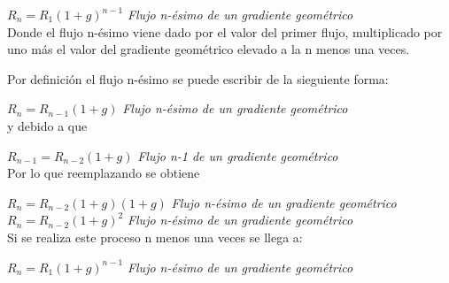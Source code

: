 \begin{itemize}
\vspace{4mm}

$R_{n} = R_{1}(1+g)^{n-1}$ \hspace{37 pt} \textit{Flujo n-ésimo de un gradiente geométrico}\\

Donde el flujo n-ésimo viene dado por el valor del primer flujo, multiplicado por uno más el valor del gradiente geométrico elevado a la n menos una veces.

\vspace{4mm}

Por definición el flujo n-ésimo se puede escribir de la sieguiente forma:

\vspace{4mm}

$R_{n} = R_{n-1}(1+g)$ \hspace{44 pt} \textit{Flujo n-ésimo de un gradiente geométrico}\\

y debido a que

\vspace{4mm}

$R_{n-1} = R_{n-2}(1+g)$ \hspace{31 pt} \textit{Flujo n-1 de un gradiente geométrico}\\

Por lo que reemplazando se obtiene

\vspace{4mm}

$R_{n} = R_{n-2}(1+g)(1+g)$ \hspace{9 pt} \textit{Flujo n-ésimo de un gradiente geométrico}\\

$R_{n} = R_{n-2}(1+g)^{2}$ \hspace{35 pt} \textit{Flujo n-ésimo de un gradiente geométrico}\\

Si se realiza este proceso n menos una veces se llega a:

\vspace{4mm}

$R_{n} = R_{1}(1+g)^{n-1}$ \hspace{35 pt} \textit{Flujo n-ésimo de un gradiente geométrico}\\

\end{itemize}

\setlength{\columnsep}{0.75cm}
\printindex






